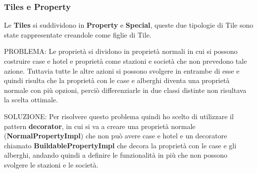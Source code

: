 \subsubsection{Tiles e Property}
Le \textbf{Tiles} si suddividono in \textbf{Property} e \textbf{Special}, queste due tipologie di Tile sono state rappresentate creandole come figlie di Tile.\newline

PROBLEMA:
Le proprietà si dividono in proprietà normali in cui si possono costruire case e hotel e proprietà come stazioni e società che non prevedono tale azione. 
Tuttavia tutte le altre azioni si possono svolgere in entrambe di esse e quindi risulta che la proprietà con le case e alberghi diventa una proprietà normale con più opzioni, 
perciò differenziarle in due classi distinte non risultava la scelta ottimale.\newline

SOLUZIONE:
Per risolvere questo problema quindi ho scelto di utilizzare il pattern \textbf{decorator}, in cui si va a creare una proprietà normale (\textbf{NormalPropertyImpl}) 
che non può avere case e hotel e un decoratore chiamato \textbf{BuildablePropertyImpl} che decora la proprietà con le case e gli alberghi,
andando quindi a definire le funzionalità in più che non possono svolgere le stazioni e le società.\newline